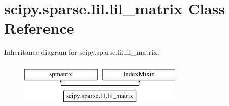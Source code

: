 \hypertarget{classscipy_1_1sparse_1_1lil_1_1lil__matrix}{}\section{scipy.\+sparse.\+lil.\+lil\+\_\+matrix Class Reference}
\label{classscipy_1_1sparse_1_1lil_1_1lil__matrix}
Inheritance diagram for scipy.\+sparse.\+lil.\+lil\+\_\+matrix\+:\begin{figure}[H]
\begin{center}
\leavevmode
\includegraphics[height=2.000000cm]{classscipy_1_1sparse_1_1lil_1_1lil__matrix}
\end{center}
\end{figure}
